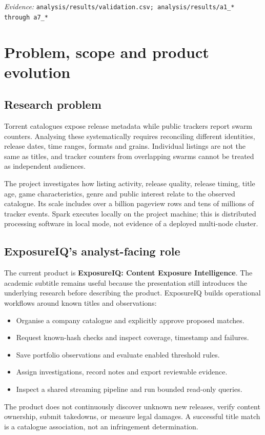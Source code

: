 \documentclass[11pt,a4paper]{article}
\newcommand{\code}[1]{{\small\nolinkurl{#1}}}
\newcommand{\source}[1]{{\footnotesize\textit{Evidence:} \code{#1}\par}}
\newcommand{\chapterpage}[1]{\clearpage\section{#1}}
\begin{document}
\source{analysis/results/validation.csv; analysis/results/a1_* through a7_*}

\clearpage
\tableofcontents

\chapterpage{Problem, scope and product evolution}
\subsection{Research problem}
Torrent catalogues expose release metadata while public trackers report
swarm counters. Analysing these systematically requires reconciling
different identities, release dates, time ranges, formats and grains.
Individual listings are not the same as titles, and tracker counters from
overlapping swarms cannot be treated as independent audiences.

The project investigates how listing activity, release quality, release
timing, title age, game characteristics, genre and public interest relate
to the observed catalogue. Its scale includes over a billion pageview rows
and tens of millions of tracker events. Spark executes locally on the
project machine; this is distributed processing software in local mode,
not evidence of a deployed multi-node cluster.

\subsection{ExposureIQ's analyst-facing role}
The current product is \textbf{ExposureIQ: Content Exposure Intelligence}.
The academic subtitle remains useful because the presentation still
introduces the underlying research before describing the product.
ExposureIQ builds operational workflows around known titles and observations:
\begin{itemize}
\item Organise a company catalogue and explicitly approve proposed matches.
\item Request known-hash checks and inspect coverage, timestamp and failures.
\item Save portfolio observations and evaluate enabled threshold rules.
\item Assign investigations, record notes and export reviewable evidence.
\item Inspect a shared streaming pipeline and run bounded read-only queries.
\end{itemize}

The product does not continuously discover unknown new releases, verify
content ownership, submit takedowns, or measure legal damages. A successful
title match is a catalogue association, not an infringement determination.
\end{document}
